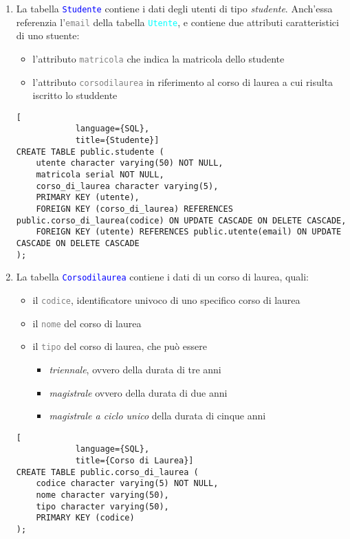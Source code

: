 \documentclass{article}
\newcommand{\tabb}[1]{\texttt{\textcolor{blue}{#1}}}
\newcommand{\tab}[1]{\texttt{\textcolor{cyan}{#1}}}
\newcommand{\attr}[1]{\texttt{\textcolor{gray}{#1}}}
\newcommand{\und}[0]{\textunderscore}
\begin{document}
\begin{enumerate}
        \item La tabella \tabb{Studente} contiene i dati degli utenti di tipo \textit{studente}. Anch'essa referenzia l'\attr{email} della tabella \tab{Utente}, e contiene due attributi caratteristici di uno stuente:
        \begin{itemize}
            \item l'attributo \attr{matricola} che indica la matricola dello studente
            \item l'attributo \attr{corso\und di\und laurea} in riferimento al corso di laurea a cui risulta iscritto lo studdente
        \end{itemize}
        \begin{lstlisting}[
            language={SQL},
            title={Studente}]
CREATE TABLE public.studente (
    utente character varying(50) NOT NULL,
    matricola serial NOT NULL,
    corso_di_laurea character varying(5),
    PRIMARY KEY (utente),
    FOREIGN KEY (corso_di_laurea) REFERENCES public.corso_di_laurea(codice) ON UPDATE CASCADE ON DELETE CASCADE,
    FOREIGN KEY (utente) REFERENCES public.utente(email) ON UPDATE CASCADE ON DELETE CASCADE
);
        \end{lstlisting}

        \item La tabella \tabb{Corso\und di\und laurea} contiene i dati di un corso di laurea, quali:
        \begin{itemize}
            \item il \attr{codice}, identificatore univoco di uno specifico corso di laurea
            \item il \attr{nome} del corso di laurea
            \item il \attr{tipo} del corso di laurea, che può essere
            \begin{itemize}
                \item \textit{triennale}, ovvero della durata di tre anni
                \item \textit{magistrale} ovvero della durata di due anni
                \item \textit{magistrale a ciclo unico} della durata di cinque anni
            \end{itemize}
        \end{itemize}
        \begin{lstlisting}[
            language={SQL},
            title={Corso di Laurea}]
CREATE TABLE public.corso_di_laurea (
    codice character varying(5) NOT NULL,
    nome character varying(50),
    tipo character varying(50),
    PRIMARY KEY (codice)
);
        \end{lstlisting}


\end{enumerate}
\end{document}
